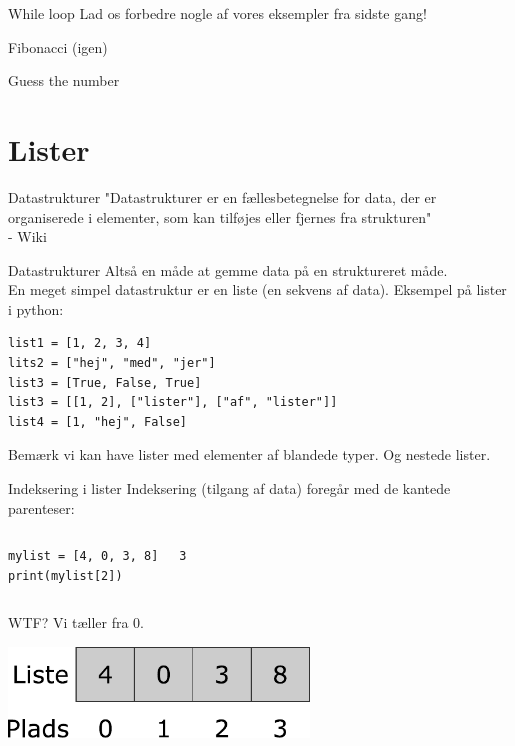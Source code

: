 \begin{frame}[fragile]{While loop}
Lad os forbedre nogle af vores eksempler fra sidste gang!

Fibonacci (igen)

Guess the number
\end{frame}


\section{Lister}

\begin{frame}{Datastrukturer}
	\Large
	"Datastrukturer er en fællesbetegnelse for data, der er organiserede i elementer, som kan tilføjes eller fjernes fra strukturen"\\
	 - Wiki
\end{frame}


\begin{frame}[fragile]{Datastrukturer}
	Altså en måde at gemme data på en struktureret måde.\\
	En meget simpel datastruktur er en liste (en sekvens af data).
	\vfill
	Eksempel på lister i python:
	\begin{lstlisting}[style=python]
list1 = [1, 2, 3, 4]
lits2 = ["hej", "med", "jer"]
list3 = [True, False, True]
list3 = [[1, 2], ["lister"], ["af", "lister"]]
list4 = [1, "hej", False]
	\end{lstlisting}
	Bemærk vi kan have lister med elementer af blandede typer. Og nestede lister.
\end{frame}

\begin{frame}[fragile]{Indeksering i lister}
	Indeksering (tilgang af data) foregår med de kantede parenteser:
	\begin{columns}
		\begin{lstlisting}[style=python]
mylist = [4, 0, 3, 8]
print(mylist[2])
		\end{lstlisting}
		\pause
		\begin{lstlisting}[style=python]
3
		\end{lstlisting}
	\end{columns}
	WTF? \pause Vi tæller fra 0.
	\begin{center}
		\includegraphics[width=0.6\textwidth]{figs/list.pdf}
	\end{center}

\end{frame}


